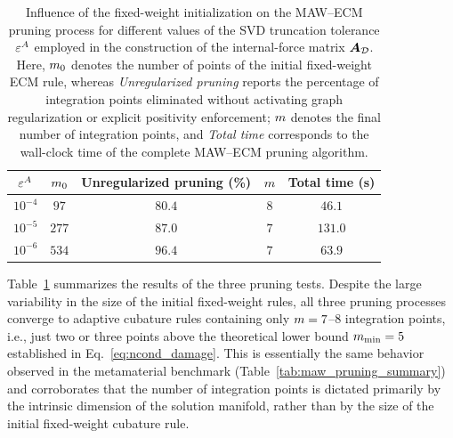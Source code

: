 \documentclass[preprint,10pt]{elsarticle}  %
\begin{document}
\begin{table}[ht!]
\centering
\caption{Influence of the fixed-weight initialization on the MAW--ECM
pruning process for different values of the SVD truncation tolerance
\(\varepsilon^A\) employed in the construction of the
internal-force matrix \(\bm{A}_{\mathcal{D}}\). Here, \(m_0\) denotes the number
of points of the initial fixed-weight ECM rule, whereas
\emph{Unregularized pruning} reports the percentage of integration
points eliminated without activating graph regularization or explicit
positivity enforcement; \(m\) denotes the final number of
integration points, and \emph{Total time} corresponds to the
wall-clock time of the complete MAW--ECM pruning algorithm.}
\label{tab:maw_pruning_summary_damage}
\begin{tabular}{ccccc}
\hline
\(\varepsilon^A\) &
\(m_0\) &
Unregularized pruning (\%) &
\(m\) &
Total time (s) \\
\hline
$10^{-4}$ & $97$  & $80.4$ & $8$ & $46.1$ \\
$10^{-5}$ & $277$ & $87.0$ & $7$ & $131.0$ \\
$10^{-6}$ & $534$ & $96.4$ & $7$ & $63.9$ \\
\hline
\end{tabular}
\end{table}

Table~\ref{tab:maw_pruning_summary_damage} summarizes the results of
the three pruning tests. Despite the large variability in the size of
the initial fixed-weight rules, all three pruning processes converge
to adaptive cubature rules containing only
\(m=7\)--\(8\) integration points, i.e., just two or three
points above the theoretical lower bound \(m_{\textrm{min}}=5\) established in
Eq.~\eqref{eq:ncond_damage}.  This is
essentially the same behavior observed in the metamaterial benchmark
(Table~\ref{tab:maw_pruning_summary}) and corroborates that the
number of integration points is dictated primarily by the intrinsic dimension
of the solution manifold, rather than by the size of the initial
fixed-weight cubature rule.
\end{document}
